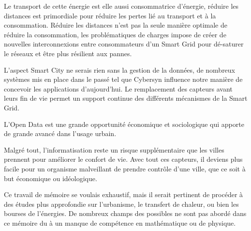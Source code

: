 Le transport de cette énergie est elle aussi consommatrice d'énergie, réduire les distances est primordiale
pour réduire les pertes lié au transport et à la consommation.
Réduire les distances n'est pas la seule manière optimale de réduire la consommation,
les problématiques de charges impose de créer de nouvelles interconnexions entre consommateurs
d'un Smart Grid pour dé-saturer le réseaux et être plus résilient aux pannes.

L'aspect Smart City ne serais rien sans la gestion de la données, de nombreux systèmes mis en place
dans le passé tel que Cybersyn influence notre manière de concevoir les applications d'aujourd'hui.
Le remplacement des capteurs avant leurs fin de vie permet un support continue des différents
mécanismes de la Smart Grid.

L'Open Data est une grande opportunité économique et sociologique qui apporte de grande avancé
dans l'usage urbain.

Malgré tout, l'informatisation reste un risque supplémentaire que les villes prennent pour améliorer le confort de vie.
Avec tout ces capteurs, il deviens plus facile pour un organisme malveillant de prendre contrôle d'une ville,
que ce soit à but économique ou idéologique.

Ce travail de mémoire se voulais exhaustif, mais il serait pertinent de procéder à des études plus approfondie
sur l'urbanisme, le transfert de chaleur, ou bien les bourses de l'énergies.
De nombreux champs des possibles ne sont pas abordé dans ce mémoire du à un manque de compétence en
mathématique ou de physique.